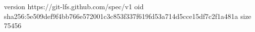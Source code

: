 version https://git-lfs.github.com/spec/v1
oid sha256:5e509def9f4bb766e572001c3c853f337f619fd53a714d5cce15df7c2f1a481a
size 75456
